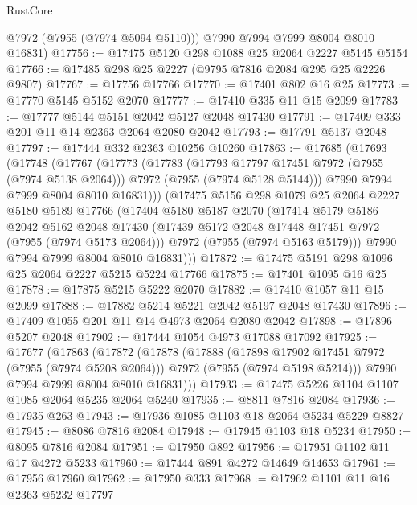 \begin{lexlean}{RustCore}
\begin{coremodule}
        @7972
        (@7955 (@7974 @5094 @5110)))
      @7990
      @7994
      @7999
      @8004
      @8010
      @16831)
@17756 := @17475 @5120 @298 @1088 @25 @2064 @2227 @5145 @5154
@17766 := @17485 @298 @25 @2227 (@9795 @7816 @2084 @295 @25 @2226 @9807)
@17767 := @17756 @17766
@17770 := @17401 @802 @16 @25
@17773 := @17770 @5145 @5152 @2070
@17777 := @17410 @335 @11 @15 @2099
@17783 := @17777 @5144 @5151 @2042 @5127 @2048 @17430
@17791 := @17409 @333 @201 @11 @14 @2363 @2064 @2080 @2042
@17793 := @17791 @5137 @2048
@17797 := @17444 @332 @2363 @10256 @10260
@17863 := @17685
    (@17693
      (@17748
        (@17767
          (@17773
            (@17783
              (@17793 @17797 @17451 @7972 (@7955 (@7974 @5138 @2064)))
              @7972
              (@7955 (@7974 @5128 @5144)))
            @7990
            @7994
            @7999
            @8004
            @8010
            @16831)))
      (@17475
        @5156
        @298
        @1079
        @25
        @2064
        @2227
        @5180
        @5189
        @17766
        (@17404
          @5180
          @5187
          @2070
          (@17414
            @5179
            @5186
            @2042
            @5162
            @2048
            @17430
            (@17439 @5172 @2048 @17448 @17451 @7972 (@7955 (@7974 @5173 @2064)))
            @7972
            (@7955 (@7974 @5163 @5179)))
          @7990
          @7994
          @7999
          @8004
          @8010
          @16831)))
@17872 := @17475 @5191 @298 @1096 @25 @2064 @2227 @5215 @5224 @17766
@17875 := @17401 @1095 @16 @25
@17878 := @17875 @5215 @5222 @2070
@17882 := @17410 @1057 @11 @15 @2099
@17888 := @17882 @5214 @5221 @2042 @5197 @2048 @17430
@17896 := @17409 @1055 @201 @11 @14 @4973 @2064 @2080 @2042
@17898 := @17896 @5207 @2048
@17902 := @17444 @1054 @4973 @17088 @17092
@17925 := @17677
    (@17863
      (@17872
        (@17878
          (@17888
            (@17898 @17902 @17451 @7972 (@7955 (@7974 @5208 @2064)))
            @7972
            (@7955 (@7974 @5198 @5214)))
          @7990
          @7994
          @7999
          @8004
          @8010
          @16831)))
@17933 := @17475 @5226 @1104 @1107 @1085 @2064 @5235 @2064 @5240
@17935 := @8811 @7816 @2084
@17936 := @17935 @263
@17943 := @17936 @1085 @1103 @18 @2064 @5234 @5229 @8827
@17945 := @8086 @7816 @2084
@17948 := @17945 @1103 @18 @5234
@17950 := @8095 @7816 @2084
@17951 := @17950 @892
@17956 := @17951 @1102 @11 @17 @4272 @5233
@17960 := @17444 @891 @4272 @14649 @14653
@17961 := @17956 @17960
@17962 := @17950 @333
@17968 := @17962 @1101 @11 @16 @2363 @5232 @17797

\end{coremodule}
\end{lexlean}
